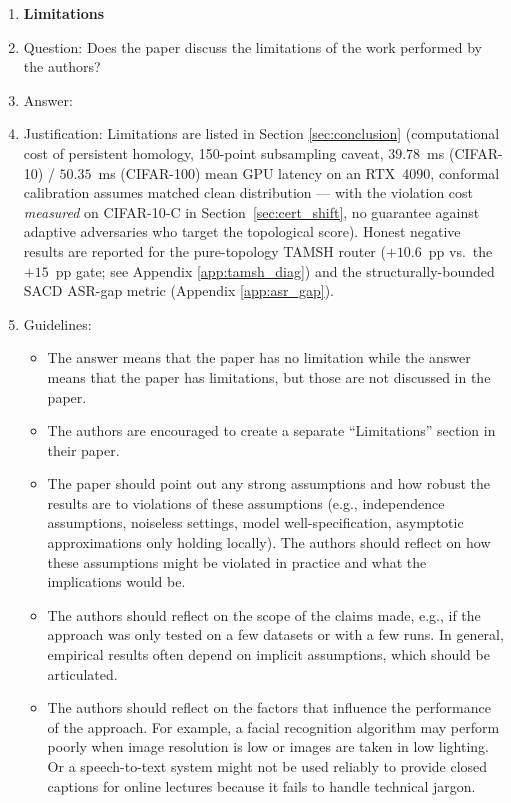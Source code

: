 \begin{enumerate}
\item {\bf Limitations}
    \item[] Question: Does the paper discuss the limitations of the work performed by the authors?
    \item[] Answer: \answerYes{}
    \item[] Justification: Limitations are listed in Section \ref{sec:conclusion} (computational cost of persistent homology, 150-point subsampling caveat, $39.78$~ms (CIFAR-10) / $50.35$~ms (CIFAR-100) mean GPU latency on an RTX~4090, conformal calibration assumes matched clean distribution --- with the violation cost \emph{measured} on CIFAR-10-C in Section~\ref{sec:cert_shift}, no guarantee against adaptive adversaries who target the topological score). Honest negative results are reported for the pure-topology TAMSH router ($+10.6$~pp vs.\ the $+15$~pp gate; see Appendix \ref{app:tamsh_diag}) and the structurally-bounded SACD ASR-gap metric (Appendix \ref{app:asr_gap}).
    \item[] Guidelines:
    \begin{itemize}
        \item The answer \answerNA{} means that the paper has no limitation while the answer \answerNo{} means that the paper has limitations, but those are not discussed in the paper. 
        \item The authors are encouraged to create a separate ``Limitations'' section in their paper.
        \item The paper should point out any strong assumptions and how robust the results are to violations of these assumptions (e.g., independence assumptions, noiseless settings, model well-specification, asymptotic approximations only holding locally). The authors should reflect on how these assumptions might be violated in practice and what the implications would be.
        \item The authors should reflect on the scope of the claims made, e.g., if the approach was only tested on a few datasets or with a few runs. In general, empirical results often depend on implicit assumptions, which should be articulated.
        \item The authors should reflect on the factors that influence the performance of the approach. For example, a facial recognition algorithm may perform poorly when image resolution is low or images are taken in low lighting. Or a speech-to-text system might not be used reliably to provide closed captions for online lectures because it fails to handle technical jargon.

\end{itemize}
\end{enumerate}
